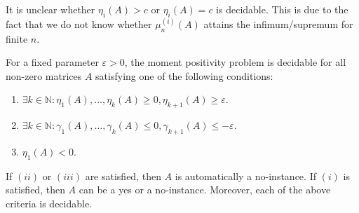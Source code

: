 It is unclear whether $\eta_i(A) > c$ or $\eta_i(A) = c$ is decidable. This is due to the fact that we do not know whether $\mu_n^{(i)}(A)$ attains the infimum/supremum for finite $n$.



\begin{theorem}\label{thm:generalVersion}
For a fixed parameter $\varepsilon > 0$, the moment positivity problem is decidable for all non-zero matrices $A$ satisfying one of the following conditions:
\begin{enumerate}[label=$(\roman*)$]
	\item\label{cond:generalVers1} $\exists k \in \mathbb{N}\colon \eta_1(A), \ldots, \eta_k(A) \geqslant 0, \eta_{k+1}(A) \geqslant \varepsilon.$
	\item\label{cond:generalVers2} $\exists k \in \mathbb{N}\colon \gamma_1(A), \ldots, \gamma_k(A) \leqslant 0, \gamma_{k+1}(A) \leqslant -\varepsilon.$
	\item\label{cond:generalVers3} $\eta_1(A) < 0.$
\end{enumerate}
If $(ii)$ or $(iii)$ are satisfied, then $A$ is automatically a no-instance. If $(i)$ is satisfied, then $A$ can be a yes or a no-instance. Moreover, each of the above criteria is decidable.
\end{theorem}
